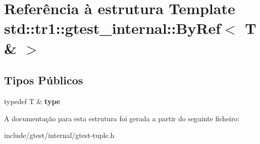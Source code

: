 \hypertarget{structstd_1_1tr1_1_1gtest__internal_1_1ByRef_3_01T_01_6_01_4}{\section{Referência à estrutura Template std\-:\-:tr1\-:\-:gtest\-\_\-internal\-:\-:By\-Ref$<$ T \& $>$}
\label{structstd_1_1tr1_1_1gtest__internal_1_1ByRef_3_01T_01_6_01_4}
}
\subsection*{Tipos Públicos}
\begin{DoxyCompactItemize}
\item 
\hypertarget{structstd_1_1tr1_1_1gtest__internal_1_1ByRef_3_01T_01_6_01_4_a512382574dbdd736320d68e313801122}{typedef T \& {\bfseries type}}\label{structstd_1_1tr1_1_1gtest__internal_1_1ByRef_3_01T_01_6_01_4_a512382574dbdd736320d68e313801122}

\end{DoxyCompactItemize}


A documentação para esta estrutura foi gerada a partir do seguinte ficheiro\-:\begin{DoxyCompactItemize}
\item 
include/gtest/internal/gtest-\/tuple.\-h\end{DoxyCompactItemize}
